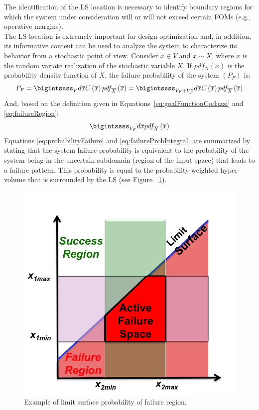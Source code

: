 The identification of the LS location is necessary to identify boundary regions for which the system under consideration will or will not exceed certain FOMs (e.g., operative margins).
\\The LS location is extremely important for design optimization and, in addition, its informative content can be used to analyze the system to characterize its behavior from a stochastic point of view. Consider $\overline{x} \in V$ and $\overline{x}\sim \overline{X}$,
where $\overline{x}$ is the random variate realization of the stochastic variable $\overline{X}$.
If $pdf_{\overline{X}}\left ( \overline{x} \right ) $ is the probability density function of $ \overline{X}$, the failure probability of the system $\left ( P_{F} \right )$ is:
\begin{equation}
\label{eq:probabilityFailure}
P_{F} = \bigintssss_{V}d\overline{x}C\left ( \overline{x} \right )pdf_{\overline{X}}\left ( \overline{x} \right ) = \bigintssss_{V_{F}+V_{F}^{c}}d\overline{x}C\left ( \overline{x} \right )pdf_{\overline{X}}\left ( \overline{x} \right )
\end{equation}
And, based on the definition given in Equations~\ref{eq:goalFunctionCodazzi} and \ref{eq:failureRegion}:
\begin{equation}
 \label{eq:failureProbIntegral}
 \bigintssss_{V_{F}}d\overline{x}pdf_{\overline{X}}\left ( \overline{x} \right )
 \end{equation}
Equations \ref{eq:probabilityFailure} and \ref{eq:failureProbIntegral} are summarized by stating that the system failure probability is
equivalent to the probability of the system being in the uncertain
subdomain (region of the input space) that leads to a failure pattern.
This probability is equal to the probability-weighted hyper-volume that is surrounded by the LS (see Figure ~\ref{fig:ProbabilityFailureLSExample}).
\begin{figure}[h!]
  \centering
  \includegraphics[width=1.0\textwidth]  {pics/ProbabilityFailureLSExample.png}
  \caption{Example of limit surface probability of failure region.}
  \label{fig:ProbabilityFailureLSExample}
\end{figure}
